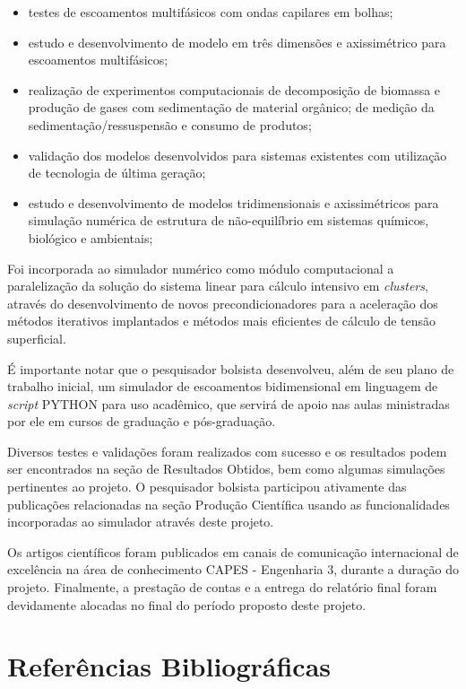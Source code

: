 \documentclass[a4paper,portuges,12pt]{article}
\begin{document}
\begin{itemize}
	\item testes de escoamentos multifásicos com ondas capilares em
	      bolhas;
	\item estudo e desenvolvimento de modelo em três dimensões e axissimétrico
	      para escoamentos multifásicos;
	\item realização de experimentos computacionais de
		  decomposição de biomassa e produção de gases com sedimentação
		  de material orgânico; de medição da sedimentação/ressuspensão
		  e consumo de produtos;
	\item validação dos modelos desenvolvidos para sistemas existentes com
	      utilização de tecnologia de última geração;
	\item estudo e desenvolvimento de modelos tridimensionais e axissimétricos
		  para simulação numérica de estrutura de não-equilíbrio em
		  sistemas químicos, biológico e ambientais;
\end{itemize}

Foi incorporada ao simulador numérico como módulo computacional a
paralelização da solução do sistema linear para cálculo intensivo em
\textit{clusters}, através do desenvolvimento de novos
precondicionadores para a aceleração dos métodos iterativos implantados
e métodos mais eficientes de cálculo de tensão superficial. 

É importante notar que o pesquisador bolsista desenvolveu, além de seu
plano de trabalho inicial, um simulador de escoamentos bidimensional em
linguagem de \textit{script} PYTHON para uso acadêmico, que servirá de
apoio nas aulas ministradas por ele em cursos de graduação e
pós-graduação.

Diversos testes e validações foram realizados com sucesso e os
resultados podem ser encontrados na seção de Resultados Obtidos, bem
como algumas simulações pertinentes ao projeto. O pesquisador bolsista
participou ativamente das publicações relacionadas na seção Produção
Científica usando as funcionalidades incorporadas ao simulador através
deste projeto. 

Os artigos científicos foram publicados em canais de
comunicação internacional de excelência na área de conhecimento CAPES -
Engenharia 3, durante a duração do projeto. Finalmente, a prestação de
contas e a entrega do relatório final foram devidamente alocadas no
final do período proposto deste projeto.  
	
\section{Referências Bibliográficas}


\end{document}
